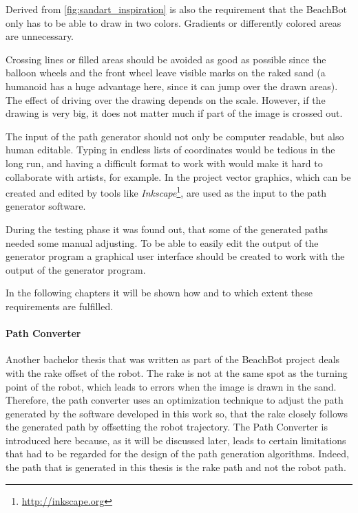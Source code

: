 Derived from \autoref{fig:sandart_inspiration} is also the requirement that the BeachBot only has to be able to draw in two colors. Gradients or differently colored areas are unnecessary.

Crossing lines or filled areas should be avoided as good as possible since the balloon wheels and the front wheel leave visible marks on the raked sand (a humanoid has a huge advantage here, since it can jump over the drawn areas). The effect of driving over the drawing depends on the scale. However, if the drawing is very big, it does not matter much if part of the image is crossed out. 

The input of the path generator should not only be computer readable, but also human editable. Typing in endless lists of coordinates would be tedious in the long run, and having a difficult format to work with would make it hard to collaborate with artists, for example.  In the project vector graphics, which can be created and edited by tools like \textit{Inkscape}\footnote{\url{http://inkscape.org}}, are used as the input to the path generator software.

During the testing phase it was found out, that some of the generated paths needed some manual adjusting. To be able to easily edit the output of the generator program a graphical user interface should be created to work with the output of the generator program. 

In the following chapters it will be shown how and to which extent these requirements are fulfilled.

\paragraph{Path Converter}\label{sec:pathconv}

Another bachelor thesis that was written as part of the BeachBot project deals with the rake offset of the robot. The rake is not at the same spot as the turning point of the robot, which leads to errors when the image is drawn in the sand. Therefore, the path converter uses an optimization technique to adjust the path generated by the software developed in this work so, that the rake closely follows the generated path by offsetting the robot trajectory. The Path Converter is introduced here because, as it will be discussed later, leads to certain limitations that had to be regarded for the design of the path generation algorithms. Indeed, the path that is generated in this thesis is the rake path and not the robot path.